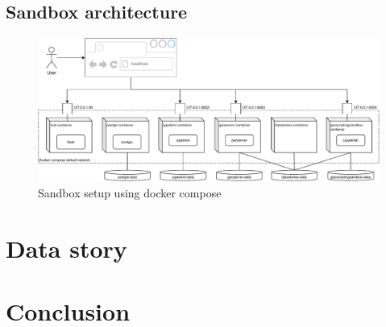 \documentclass[11pt, a4paper, oneside, parskip=full-]{scrartcl}
\begin{document}
\subsection{Sandbox architecture}

\begin{figure}[H]
  \centering
  \includegraphics[width=1\textwidth]{composeSetup}
  \caption{Sandbox setup using docker compose}
  \label{fig:sandboxsetup}
\end{figure}

\section{Data story}

\section{Conclusion}
\end{document}
